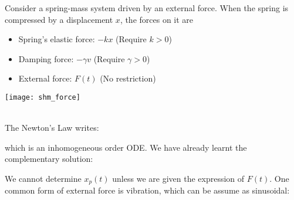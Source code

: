 \documentclass[class=article, crop=false, 12pt]{standalone}
\begin{document}
Consider a spring-mass system driven by an external force.
When the spring is compressed by a displacement $x$, the forces on it are

\begin{minipage}{0.7\textwidth}
    \begin{itemize}
        \item Spring's elastic force: $-kx$ (Require $k>0$)
        \item Damping force: $-\gamma v$ (Require $\gamma >0$)
        \item External force: $F(t)$ (No restriction)
    \end{itemize}
\end{minipage}
\begin{minipage}{0.28\textwidth}
    \texttt{[image: shm\_force]}
\end{minipage}

\hfill\\[1em]
The Newton's  Law writes:

which is an inhomogeneous  order ODE. 
We have already learnt the complementary solution:

We cannot determine $x_p(t)$ unless we are given the expression of $F(t)$.
One common form of external force is vibration, 
which can be assume as sinusoidal:
\end{document}
